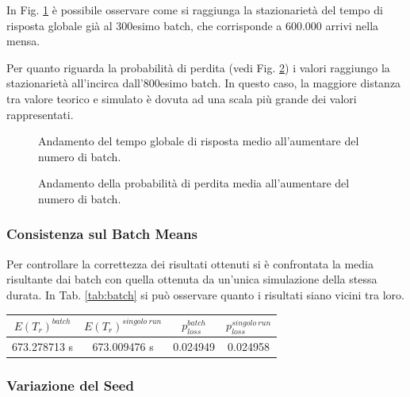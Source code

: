\documentclass{article}
\begin{document}
In Fig. \ref{fig:grt_infinite_batch} è possibile osservare come si raggiunga la stazionarietà del tempo di risposta globale già al 300esimo batch, che corrisponde a 600.000 arrivi nella mensa. 

Per quanto riguarda la probabilità di perdita (vedi Fig. \ref{fig:ploss_infinite_batch}) i valori raggiungo la stazionarietà all'incirca dall'800esimo batch. In questo caso, la maggiore distanza tra valore teorico e simulato è dovuta ad una scala più grande dei valori rappresentati. 

\begin{figure}[htbp]
  \centering
  
  \caption{Andamento del tempo globale di risposta medio all'aumentare del numero di batch.}
  \label{fig:grt_infinite_batch}
\end{figure}

\begin{figure}[htbp]
  \centering
  
  \caption{Andamento della probabilità di perdita media all'aumentare del numero di batch.}
  \label{fig:ploss_infinite_batch}
\end{figure}
\FloatBarrier

\subsubsection{Consistenza sul Batch Means}

Per controllare la correttezza dei risultati ottenuti si è confrontata la media risultante dai batch con quella ottenuta da un'unica simulazione della stessa durata. In Tab. \ref{tab:batch} si può osservare quanto i risultati siano vicini tra loro.

\begin{center}\label{tab:batch}
\begin{tabular}{|c|c|c|c|}
 \hline
 \textbf{$E(T_{r})^{batch}$} & \textbf{$E(T_{r})^{singolo\ run}$} & \textbf{$p_{loss}^{batch}$} & \textbf{$p_{loss}^{singolo\ run}$}\\
 \hline
 673.278713 s & 673.009476 s & 0.024949 & 0.024958\\
 \hline
\end{tabular}
\end{center}

\subsubsection{Variazione del Seed}
\end{document}
